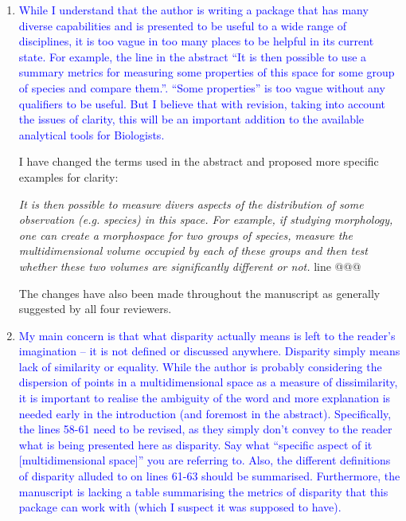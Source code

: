 \documentclass[12pt,letterpaper]{article}
\begin{document}
\begin{enumerate}

\item{\textcolor{blue}{While I understand that the author is writing a package that has many diverse capabilities and is presented to be useful to a wide range of disciplines, it is too vague in too many places to be helpful in its current state.
For example, the line in the abstract “It is then possible to use a summary metrics for measuring some properties of this space for some group of species and compare them.”.
“Some properties” is too vague without any qualifiers to be useful. But I believe that with revision, taking into account the issues of clarity, this will be an important addition to the available analytical tools for Biologists.}}

I have changed the terms used in the abstract and proposed more specific examples for clarity:

\textit{It is then possible to measure divers aspects of the distribution of some observation (e.g. species) in this space. For example, if studying morphology, one can create a morphospace for two groups of species, measure the multidimensional volume occupied by each of these groups and then test whether these two volumes are significantly different or not.} line @@@

The changes have also been made throughout the manuscript as generally suggested by all four reviewers.

\item{\textcolor{blue}{My main concern is that what disparity actually means is left to the reader’s imagination – it is not defined or discussed anywhere.
Disparity simply means lack of similarity or equality.
While the author is probably considering the dispersion of points in a multidimensional space as a measure of dissimilarity, it is important to realise the ambiguity of the word and more explanation is needed early in the introduction (and foremost in the abstract).
Specifically, the lines 58-61 need to be revised, as they simply don’t convey to the reader what is being presented here as disparity.
Say what “specific aspect of it [multidimensional space]” you are referring to.
Also, the different definitions of disparity alluded to on lines 61-63 should be summarised.
Furthermore, the manuscript is lacking a table summarising the metrics of disparity that this package can work with (which I suspect it was supposed to have).}}
\label{define_disparity}



\end{enumerate}
\end{document}
